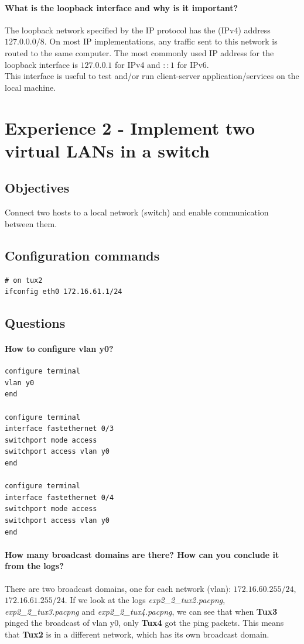 \documentclass[11pt]{report}
\newcommand{\tux}[1]{\textbf{Tux#1}}
\begin{document}
\paragraph{What is the loopback interface and why is it important?}
The loopback network specified by the IP protocol has the (IPv4) address
$127.0.0.0/8$. On most IP implementations, any traffic sent to this network
is routed to the same computer. The most commonly used IP address for the
loopback interface is $127.0.0.1$ for IPv4 and $::1$ for IPv6.\\
This interface is useful to test and/or run client-server application/services
on the local machine.

\section{Experience 2 - Implement two virtual LANs in a switch}

\subsection{Objectives}
Connect two hosts to a local network (switch) and enable communication between
them.

\subsection{Configuration commands}
\begin{lstlisting}
# on tux2
ifconfig eth0 172.16.61.1/24
\end{lstlisting}

\subsection{Questions}
\paragraph{How to configure vlan y0?}
\begin{lstlisting}
configure terminal
vlan y0
end

configure terminal 
interface fastethernet 0/3
switchport mode access
switchport access vlan y0
end

configure terminal 
interface fastethernet 0/4
switchport mode access
switchport access vlan y0
end
\end{lstlisting}

\paragraph{How many broadcast domains are there? How can you conclude it from the logs?}
There are two broadcast domains, one for each network (vlan):
$172.16.60.255/24$, $172.16.61.255/24$. If we look at the logs
\textit{exp2\_2\_tux2.pacpng}, \textit{exp2\_2\_tux3.pacpng} and \textit{exp2\_2\_tux4.pacpng},
we can see that when \tux{3} pinged the broadcast of vlan y0, only \tux{4}
got the ping packets. This means that \tux{2} is in a different network, which
has its own broadcast domain.
\end{document}
